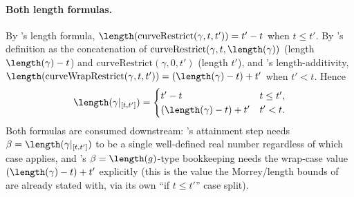 \begin{definition}
  \paragraph{Both length formulas.} By 's length formula,
  $\length(\mathrm{curveRestrict}(\gamma,t,t')) = t'-t$ when $t \le t'$. By
  's definition as the concatenation of
  $\mathrm{curveRestrict}(\gamma,t,\length(\gamma))$ (length $\length(\gamma)-t$) and
  $\mathrm{curveRestrict}(\gamma,0,t')$ (length $t'$), and 's length-additivity,
  $\length(\mathrm{curveWrapRestrict}(\gamma,t,t')) = (\length(\gamma)-t)+t'$ when $t'<t$. Hence
  \[
    \length(\gamma|_{[t,t']}) =
    \begin{cases}
      t'-t & t \le t' , \\
      (\length(\gamma)-t)+t' & t' < t .
    \end{cases}
  \]
  Both formulas are consumed downstream: 's attainment step needs
  $\beta = \length(\gamma|_{[t,t']})$ to be a single well-defined real number regardless of which
  case applies, and 's $\beta = \length(g)$-type bookkeeping needs the wrap-case
  value $(\length(\gamma)-t)+t'$ explicitly (this is the value the Morrey/length bounds of
   are already stated with, via its own ``if $t\le t'$'' case split).


\end{definition}
